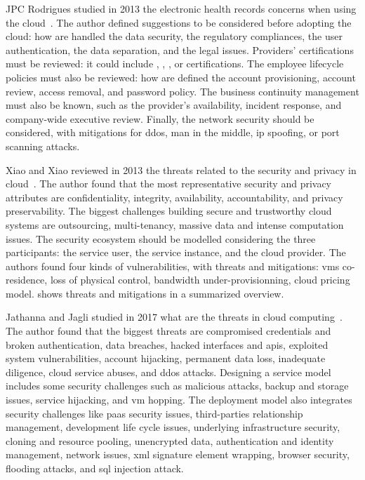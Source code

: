 JPC Rodrigues studied in 2013 the electronic health records concerns when using the \gls{cloud}~\cite{jpc_rodrigues_analysis_2013}. The author defined suggestions to be considered before adopting the \gls{cloud}: how are handled the data security, the regulatory compliances, the user authentication, the data separation, and the legal issues. Providers' certifications must be reviewed: it could include , , , or  certifications. The employee lifecycle policies must also be reviewed: how are defined the account provisioning, account review, access removal, and password policy. The business continuity management must also be known, such as the provider's availability, incident response, and company-wide executive review. Finally, the network security should be considered, with mitigations for \gls{ddos}, man in the middle, \gls{ip} spoofing, or port scanning attacks. %

Xiao and Xiao reviewed in 2013 the threats related to the security and privacy in \gls{cloud}~\cite{xiao_security_2013}. The author found that the most representative security and privacy attributes are confidentiality, integrity, availability, accountability, and privacy preservability. The biggest challenges building secure and trustworthy \gls{cloud} systems are outsourcing, multi-tenancy, massive data and intense computation issues. The security ecosystem should be modelled considering the three participants: the service user, the service instance, and the cloud provider. The authors found four kinds of vulnerabilities, with threats and mitigations: \glspl{vm} co-residence, loss of physical control, bandwidth under-provisionning, cloud pricing model.  shows threats and mitigations in a summarized overview. %


Jathanna and Jagli studied in 2017 what are the threats in \gls{cloud} computing~\cite{jathanna_cloud_2017}. The author found that the biggest threats are compromised credentials and broken authentication, data breaches, hacked interfaces and \glspl{api}, exploited system vulnerabilities, account hijacking, permanent data loss, inadequate diligence, cloud service abuses, and \gls{ddos} attacks. Designing a service model includes some security challenges such as malicious attacks, backup and storage issues, service hijacking, and \gls{vm} hopping. The deployment model also integrates security challenges like \gls{paas} security issues, third-parties relationship management, development life cycle issues, underlying infrastructure security, cloning and resource pooling, unencrypted data, authentication and identity management, network issues, \gls{xml} signature element wrapping, browser security, flooding attacks, and \gls{sql} injection attack. %

